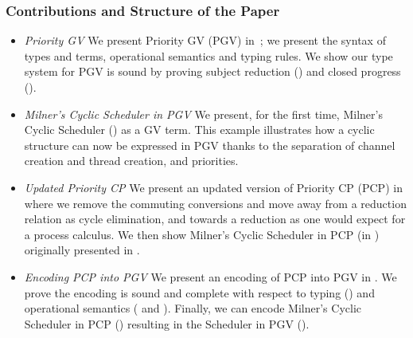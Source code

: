 \documentclass[main.tex]{subfiles}
\begin{document}
\subsubsection*{Contributions and Structure of the Paper}
\begin{itemize}
\item \emph{Priority GV} We present Priority GV (PGV) in~; we present the syntax of types and terms, operational semantics and typing rules. We show our type system for PGV is sound by proving subject reduction () and closed progress ().
\item \emph{Milner's Cyclic Scheduler in PGV} We present, for the first time, Milner's Cyclic Scheduler \cite{milner89} () as a GV term. This example illustrates how a cyclic structure can now be expressed in PGV thanks to the separation of channel creation and thread creation, and priorities.
\item \emph{Updated Priority CP} We present an updated version of Priority CP (PCP) \cite{dardhagay18} in  where we remove the commuting conversions and move away from a reduction relation as cycle elimination, and towards a reduction as one would expect for a process calculus. We then show Milner's Cyclic Scheduler in PCP (in ) originally presented in \cite{dardhagay18}.
\item \emph{Encoding PCP into PGV} We present an encoding of PCP into PGV in . We prove the encoding is sound and complete with respect to typing () and operational semantics ( and ). Finally, we can encode Milner's Cyclic Scheduler in PCP () resulting in the Scheduler in PGV ().
\end{itemize}
\end{document}
